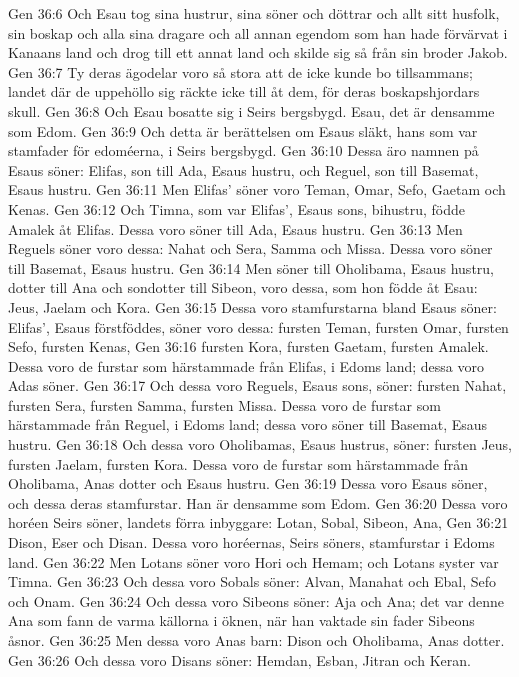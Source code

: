 Gen 36:6  Och Esau tog sina hustrur, sina söner och döttrar och allt sitt husfolk, sin boskap och alla sina dragare och all annan egendom som han hade förvärvat i Kanaans land och drog till ett annat land och skilde sig så från sin broder Jakob.
Gen 36:7  Ty deras ägodelar voro så stora att de icke kunde bo tillsammans; landet där de uppehöllo sig räckte icke till åt dem, för deras boskapshjordars skull.
Gen 36:8  Och Esau bosatte sig i Seirs bergsbygd. Esau, det är densamme som Edom.
Gen 36:9  Och detta är berättelsen om Esaus släkt, hans som var stamfader för edoméerna, i Seirs bergsbygd.
Gen 36:10  Dessa äro namnen på Esaus söner: Elifas, son till Ada, Esaus hustru, och Reguel, son till Basemat, Esaus hustru.
Gen 36:11  Men Elifas' söner voro Teman, Omar, Sefo, Gaetam och Kenas.
Gen 36:12  Och Timna, som var Elifas', Esaus sons, bihustru, födde Amalek åt Elifas. Dessa voro söner till Ada, Esaus hustru.
Gen 36:13  Men Reguels söner voro dessa: Nahat och Sera, Samma och Missa. Dessa voro söner till Basemat, Esaus hustru.
Gen 36:14  Men söner till Oholibama, Esaus hustru, dotter till Ana och sondotter till Sibeon, voro dessa, som hon födde åt Esau: Jeus, Jaelam och Kora.
Gen 36:15  Dessa voro stamfurstarna bland Esaus söner: Elifas', Esaus förstföddes, söner voro dessa: fursten Teman, fursten Omar, fursten Sefo, fursten Kenas,
Gen 36:16  fursten Kora, fursten Gaetam, fursten Amalek. Dessa voro de furstar som härstammade från Elifas, i Edoms land; dessa voro Adas söner.
Gen 36:17  Och dessa voro Reguels, Esaus sons, söner: fursten Nahat, fursten Sera, fursten Samma, fursten Missa. Dessa voro de furstar som härstammade från Reguel, i Edoms land; dessa voro söner till Basemat, Esaus hustru.
Gen 36:18  Och dessa voro Oholibamas, Esaus hustrus, söner: fursten Jeus, fursten Jaelam, fursten Kora. Dessa voro de furstar som härstammade från Oholibama, Anas dotter och Esaus hustru.
Gen 36:19  Dessa voro Esaus söner, och dessa deras stamfurstar. Han är densamme som Edom.
Gen 36:20  Dessa voro horéen Seirs söner, landets förra inbyggare: Lotan, Sobal, Sibeon, Ana,
Gen 36:21  Dison, Eser och Disan. Dessa voro horéernas, Seirs söners, stamfurstar i Edoms land.
Gen 36:22  Men Lotans söner voro Hori och Hemam; och Lotans syster var Timna.
Gen 36:23  Och dessa voro Sobals söner: Alvan, Manahat och Ebal, Sefo och Onam.
Gen 36:24  Och dessa voro Sibeons söner: Aja och Ana; det var denne Ana som fann de varma källorna i öknen, när han vaktade sin fader Sibeons åsnor.
Gen 36:25  Men dessa voro Anas barn: Dison och Oholibama, Anas dotter.
Gen 36:26  Och dessa voro Disans söner: Hemdan, Esban, Jitran och Keran.
